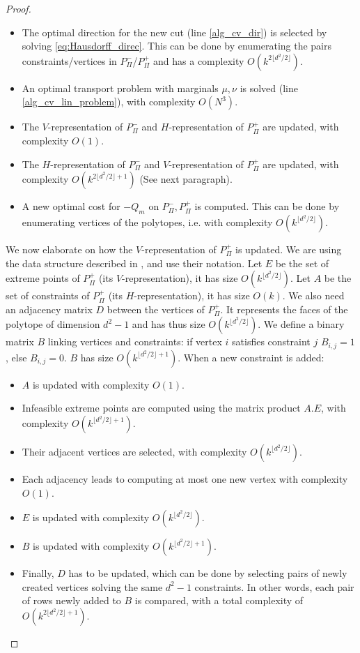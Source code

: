 \documentclass{article}
\newcommand{\1}{\mathbf{1}}
\theoremstyle{definition}
\theoremstyle{remark}
\begin{document}
\begin{appendices}
\begin{proof}
    \begin{itemize}
        \item The optimal direction for the new cut (line \ref{alg_cv_dir}) is selected by solving \eqref{eq:Hausdorff_direc}. This can be done by enumerating the pairs constraints/vertices in $P_\Pi^-$/$P_\Pi^+$ and has a complexity $O(k^{2\lfloor d^2/2\rfloor})$.
        \item An optimal transport problem with marginals $\mu,\nu$ is solved (line \ref{alg_cv_lin_problem}), with complexity $O(N^3)$.
        \item The $V$-representation of $P_\Pi^-$ and $H$-representation of $P_\Pi^+$ are updated, with complexity $O(1)$.
        \item The $H$-representation of $P_\Pi^-$ and $V$-representation of $P_\Pi^+$ are updated, with complexity $O(k^{2\lfloor d^2/2\rfloor+1})$ (See next paragraph).
        \item A new optimal cost for $-Q_m$ on $P_\Pi^-,P_\Pi^+$ is computed. This can  be done by enumerating vertices of the polytopes, i.e. with complexity  $O(k^{\lfloor d^2/2\rfloor})$.
    \end{itemize}
    
     We now elaborate on how the $V$-representation of $P_\Pi^+$ is updated. We are using the data structure described in \cite[Appendix A3]{ryner2023globally}, and use their notation. Let $E$ be the set of extreme points of  $P_\Pi^+$ (its $V$-representation), it has size $O(k^{\lfloor d^2/2\rfloor})$. Let $A$ be the set of constraints of  $P_\Pi^+$ (its $H$-representation), it has size $O(k)$. We also need an adjacency matrix $D$ between the vertices of $P_\Pi^+$. It represents the faces of the polytope of dimension $d^2-1$ and has thus size $O(k^{\lfloor d^2/2\rfloor})$. We define a binary matrix $B$ linking vertices and constraints: if vertex $i$ satisfies constraint $j$ $B_{i,j}=1$, else $B_{i,j}=0$. $B$ has size $O(k^{\lfloor d^2/2\rfloor+1})$. When a new constraint is added:
     \begin{itemize}
         \item $A$ is updated with complexity $O(1)$.
         \item Infeasible extreme points are computed using the matrix product $A.E$, with complexity $O(k^{\lfloor d^2/2\rfloor+1})$.
         \item Their adjacent vertices are selected, with complexity $O(k^{\lfloor d^2/2\rfloor})$.
         \item Each adjacency leads to computing at most one new vertex with complexity $O(1)$.
         \item $E$ is updated with complexity $O(k^{\lfloor d^2/2\rfloor})$.
         \item $B$ is updated with complexity $O(k^{\lfloor d^2/2\rfloor+1})$.
         \item  Finally, $D$ has to be updated, which can be done by selecting pairs of  newly created vertices solving the same $d^2-1$ constraints. In other words, each pair of  rows newly added to $B$ is compared, with a total complexity of  $O(k^{2\lfloor d^2/2\rfloor+1})$.
     \end{itemize}


\end{proof}
\end{appendices}
\end{document}
